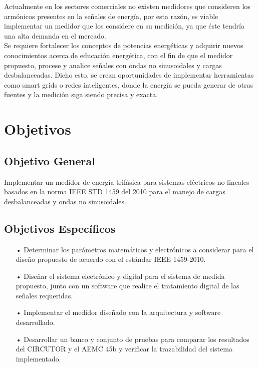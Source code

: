 Actualmente en los sectores comerciales no existen medidores que consideren los armónicos presentes en la señales de energía, por esta razón, es viable implementar un medidor que los considere en su medición, ya que éste tendría una alta demanda en el mercado. \\

Se requiere fortalecer los conceptos de potencias energéticas y adquirir nuevos conocimientos acerca de educación energética, con el fin de que el medidor propuesto, procese y analice señales con ondas no sinusoidales y cargas desbalanceadas. Dicho esto, se crean oportunidades de implementar herramientas como smart grids o redes inteligentes, donde la energía se pueda generar de otras fuentes y la medición siga siendo precisa y exacta.


\newpage{\clearpage}
\chapter{ Objetivos}
\section{Objetivo General}

Implementar un medidor de energía trifásica para sistemas eléctricos no lineales basados en la norma IEEE STD 1459 del 2010 para el manejo de cargas desbalanceadas y ondas no sinusoidales.

\section{Objetivos Específicos}
\begin{itemize}
\item[•]Determinar los parámetros matemáticos y electrónicos a considerar para el diseño propuesto de acuerdo con el estándar IEEE 1459-2010.

\item[•]	Diseñar el sistema electrónico y digital para el sistema de medida propuesto, junto con un software que realice el tratamiento digital de las señales requeridas.

\item[•] Implementar el medidor diseñado con la arquitectura y software desarrollado.

\item[•] Desarrollar un banco y conjunto de pruebas para comparar los resultados del CIRCUTOR y el AEMC 45b y verificar la trazabilidad del sistema implementado.

\end{itemize}



